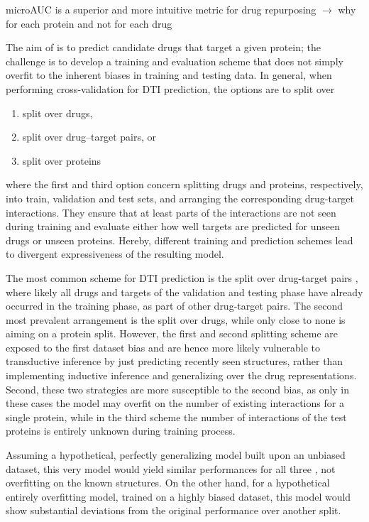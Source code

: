 \documentclass{bioinfo}
\begin{document}
microAUC is a superior and more intuitive metric for drug repurposing $\rightarrow$ why for each protein and not for each drug


The aim of \name is to predict candidate drugs that target a given
protein; the challenge is to develop a training and evaluation scheme
that does not simply overfit to the inherent biases in training and
testing data.
In general, when performing cross-validation for DTI prediction, the
options are to split over 
\begin{enumerate}
	\item split over drugs,
	\item split over drug--target pairs, or
	\item split over proteins
\end{enumerate}
where the first and third option concern splitting drugs and proteins,
respectively, into train, validation and test sets, and arranging the
corresponding drug-target interactions. They ensure that at least
parts of the interactions are not seen during training and evaluate
either how well targets are predicted for unseen drugs or unseen
proteins. Hereby, different training and prediction schemes lead to
divergent expressiveness of the resulting model.

 The most common scheme for DTI
prediction is the split over drug-target pairs \citep{Survey2018},
where likely all drugs and targets of the validation and testing phase
have already occurred in the training phase, as part of other
drug-target pairs. The second most prevalent arrangement is the split
over drugs, while only close to none is aiming on a protein split.
However, the first and second splitting scheme are exposed to the
first dataset bias and are hence more likely vulnerable to
transductive inference by just predicting recently seen structures,
rather than implementing inductive inference and generalizing over the
drug representations. Second, these two strategies are more
susceptible to the second bias, as only in these cases the model may
overfit on the number of existing interactions for a single protein,
while in the third scheme the number of interactions of the test
proteins is entirely unknown during training process.

Assuming a hypothetical, perfectly generalizing model built upon an
unbiased dataset, this very model would yield similar performances for
all three , not overfitting on the known
structures. On the other hand, for a hypothetical entirely overfitting
model, trained on a highly biased dataset, this model would show
substantial deviations from the original performance over another
split.
\end{document}
